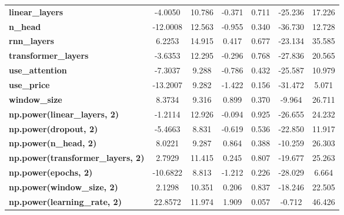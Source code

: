 \begin{center}
\begin{tabular}{lcccccc}
\textbf{linear\_layers}                   &      -4.0050  &       10.786     &    -0.371  &         0.711        &      -25.236    &       17.226     \\
\textbf{n\_head}                          &     -12.0008  &       12.563     &    -0.955  &         0.340        &      -36.730    &       12.728     \\
\textbf{rnn\_layers}                      &       6.2253  &       14.915     &     0.417  &         0.677        &      -23.134    &       35.585     \\
\textbf{transformer\_layers}              &      -3.6353  &       12.295     &    -0.296  &         0.768        &      -27.836    &       20.565     \\
\textbf{use\_attention}                   &      -7.3037  &        9.288     &    -0.786  &         0.432        &      -25.587    &       10.979     \\
\textbf{use\_price}                       &     -13.2007  &        9.282     &    -1.422  &         0.156        &      -31.472    &        5.071     \\
\textbf{window\_size}                     &       8.3734  &        9.316     &     0.899  &         0.370        &       -9.964    &       26.711     \\
\textbf{np.power(linear\_layers, 2)}      &      -1.2114  &       12.926     &    -0.094  &         0.925        &      -26.655    &       24.232     \\
\textbf{np.power(dropout, 2)}             &      -5.4663  &        8.831     &    -0.619  &         0.536        &      -22.850    &       11.917     \\
\textbf{np.power(n\_head, 2)}             &       8.0221  &        9.287     &     0.864  &         0.388        &      -10.259    &       26.303     \\
\textbf{np.power(transformer\_layers, 2)} &       2.7929  &       11.415     &     0.245  &         0.807        &      -19.677    &       25.263     \\
\textbf{np.power(epochs, 2)}              &     -10.6822  &        8.813     &    -1.212  &         0.226        &      -28.029    &        6.664     \\
\textbf{np.power(window\_size, 2)}        &       2.1298  &       10.351     &     0.206  &         0.837        &      -18.246    &       22.505     \\
\textbf{np.power(learning\_rate, 2)}      &      22.8572  &       11.974     &     1.909  &         0.057        &       -0.712    &       46.426     \\

\end{tabular}
\end{center}
